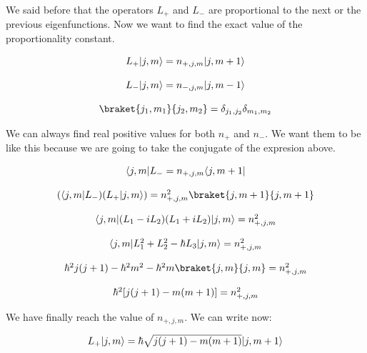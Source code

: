 We said before that the operators $L_+$ and $L_-$ are proportional to the next or the previous eigenfunctions. Now we want to find the exact value of the proportionality constant.

\begin{equation}
  \begin{array}{c}
    L_+ \ket{j,m} = n_{+,j,m} \ket{j,m+1}
    \\

    \\
    L_- \ket{j,m} = n_{-,j,m} \ket{j,m-1}
    \\

    \\
    \braket{j_1,m_1}{j_2,m_2} = \delta_{j_1,j_2}\delta_{m_1,m_2}
  \end{array}
\end{equation}

We can always find real positive values for both $n_+$ and $n_-$. We want them to be like this because we are going to take the conjugate of the expresion above.

\begin{equation}
  \begin{array}{c}
    \bra{j,m}L_- = n_{+,j,m} \bra{j,m+1}
    \\

    \\
    (\bra{j,m}L_-)(L_+\ket{j,m}) = n_{+,j,m}^2  \braket{j,m+1}{j,m+1}
    \\

    \\
    \bra{j,m}(L_1-iL_2)(L_1+iL_2)\ket{j,m} = n_{+,j,m}^2
    \\

    \\
    \bra{j,m}L_1^2+L_2^2-\hbar L_3\ket{j,m} = n_{+,j,m}^2
    \\

    \\
    \hbar^2 j(j+1) - \hbar^2 m^2 - \hbar^2 m \braket{j,m}{j,m} = n_{+,j,m}^2
    \\

    \\
    \hbar^2 [j(j+1) - m(m+1)] = n_{+,j,m}^2
  \end{array}
\end{equation}

We have finally reach the value of $n_{+,j,m}$. We can write now:

\begin{equation}
  \begin{array}{c}
    L_+ \lvert j,m\rangle = \hbar \sqrt{j(j+1) - m(m+1)} \lvert j,m+1\rangle
  \end{array}
\end{equation}

